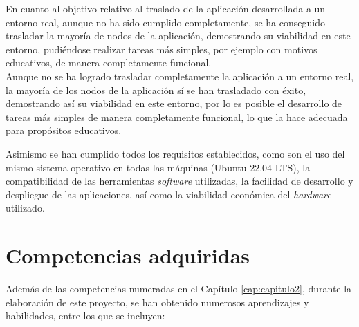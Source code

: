 En cuanto al objetivo relativo al traslado de la aplicación desarrollada a un
entorno real, aunque no ha sido cumplido completamente, se ha conseguido
trasladar la mayoría de nodos de la aplicación, demostrando su viabilidad en
este entorno, pudiéndose realizar tareas más simples, por ejemplo con motivos
educativos, de manera completamente funcional.
\\

Aunque no se ha logrado trasladar completamente la aplicación a un entorno real,
la mayoría de los nodos de la aplicación sí se han trasladado con éxito,
demostrando así su viabilidad en este entorno, por lo es posible el desarrollo
de tareas más simples de manera completamente funcional, lo que la hace adecuada
para propósitos educativos.

Asimismo se han cumplido todos los requisitos establecidos, como son el uso del
mismo sistema operativo en todas las máquinas (Ubuntu 22.04 LTS), la
compatibilidad de las herramientas \textit{software} utilizadas, la facilidad de
desarrollo y despliegue de las aplicaciones, así como la viabilidad económica
del \textit{hardware} utilizado.
\\



\section{Competencias adquiridas}
\label{sec:competencias_adquiridas}

Además de las competencias numeradas en el Capítulo \ref{cap:capitulo2}, durante
la elaboración de este proyecto, se han obtenido numerosos aprendizajes y
habilidades, entre los que se incluyen:

